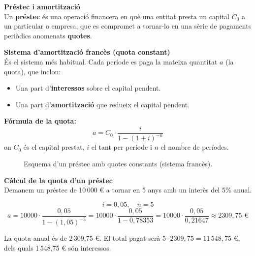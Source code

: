 \documentclass[12pt]{article}
\begin{document}
\begin{concept}
\textbf{Préstec i amortització}\\
Un \textbf{préstec} és una operació financera en què una entitat presta un capital $C_0$ a un particular o empresa, que es compromet a tornar-lo en una sèrie de pagaments periòdics anomenats \textbf{quotes}.

\textbf{Sistema d'amortització francès (quota constant)}\\
És el sistema més habitual. Cada període es paga la mateixa quantitat $a$ (la quota), que inclou:
\begin{itemize}
    \item Una part d'\textbf{interessos} sobre el capital pendent.
    \item Una part d'\textbf{amortització} que redueix el capital pendent.
\end{itemize}

\textbf{Fórmula de la quota:}
\[
\boxed{a = C_0 \cdot \dfrac{i}{1 - (1+i)^{-n}}}
\]
on $C_0$ és el capital prestat, $i$ el tant per període i $n$ el nombre de períodes.
\end{concept}

\begin{figure}[H]
\centering
{}
\caption{Esquema d'un préstec amb quotes constants (sistema francès).}
\end{figure}

\begin{exemple}
\textbf{Càlcul de la quota d'un préstec}\\
Demanem un préstec de 10\,000 € a tornar en 5 anys amb un interès del 5\% anual.

\[
i = 0{,}05, \quad n = 5
\]
\[
a = 10000 \cdot \dfrac{0{,}05}{1 - (1{,}05)^{-5}} = 10000 \cdot \dfrac{0{,}05}{1 - 0{,}78353} = 10000 \cdot \dfrac{0{,}05}{0{,}21647} \approx 2309{,}75 \text{ €}
\]

La quota anual és de 2\,309{,}75 €. El total pagat serà $5 \cdot 2309{,}75 = 11\,548{,}75$ €, dels quals 1\,548{,}75 € són interessos.
\end{exemple}
\end{document}
